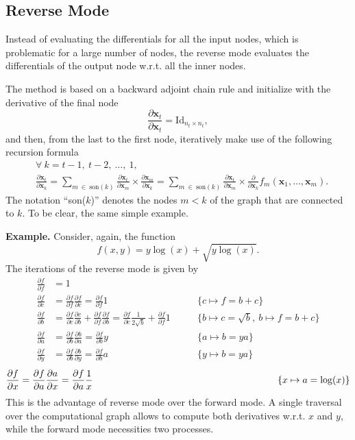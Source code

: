 \subsection{Reverse Mode}

Instead of evaluating the differentials for all the input nodes, which
is problematic for a large number of nodes, the reverse mode evaluates
the differentials of the output node w.r.t. all the inner nodes.

The method is based on a backward adjoint chain rule and initialize with
the derivative of the final node
\[
  \frac{\partial\bm{x}_{t}}{\partial\bm{x}_{t}} =
  \text{Id}_{n_{t} \times n_{t}},
\]
and then, from the last to the first node, iteratively make use of the
following recursion formula
\begin{align*}
  &\forall~k = t - 1,~t - 2,~\dots,~1,\\
  &\frac{\partial\bm{x}_{t}}{\partial\bm{x}_{k}} =
    \sum_{m~\in~\text{son}(k)}
    \frac{\partial\bm{x}_{t}}{\partial\bm{x}_{m}}\times
    \frac{\partial\bm{x}_{m}}{\partial\bm{x}_{k}} =
    \sum_{m~\in~\text{son}(k)}
    \frac{\partial\bm{x}_{t}}{\partial\bm{x}_{m}}\times
    \frac{\partial}{\partial\bm{x}_{k}}
    f_{m}(\bm{x}_{1}, \dots, \bm{x}_{m}).
\end{align*}
The notation ``son(\(k\))'' denotes the nodes \(m < k\) of the graph
that are connected to \(k\). To be clear, the same simple example.

\noindent\textbf{Example.}\hspace{.5cm}
Consider, again, the function
\[
  f(x, y) = y\log(x) + \sqrt{y\log(x)}.
\]
The iterations of the reverse mode is given by
\begin{align*}
  \frac{\partial f}{\partial f} &= 1\\
  \frac{\partial f}{\partial c} &=
  \frac{\partial f}{\partial f} \frac{\partial f}{\partial c} =
  \frac{\partial f}{\partial f} 1\qquad &\{c \mapsto f = b + c\}\\
  \frac{\partial f}{\partial b} &=
  \frac{\partial f}{\partial c} \frac{\partial c}{\partial b} +
  \frac{\partial f}{\partial f} \frac{\partial f}{\partial b} =
  \frac{\partial f}{\partial c} \frac{1}{2\sqrt{b}} +
  \frac{\partial f}{\partial f} 1\qquad
  &\{b \mapsto c = \sqrt{b},~b \mapsto f = b + c\}\\
  \frac{\partial f}{\partial a} &=
  \frac{\partial f}{\partial b} \frac{\partial b}{\partial a} =
  \frac{\partial f}{\partial b} y\qquad &\{a \mapsto b = ya\}\\
  \frac{\partial f}{\partial y} &=
  \frac{\partial f}{\partial b} \frac{\partial b}{\partial y} =
  \frac{\partial f}{\partial b} a \qquad &\{y \mapsto b = ya\}
\end{align*}
\begin{align*}
  \frac{\partial f}{\partial x} &=
  \frac{\partial f}{\partial a} \frac{\partial a}{\partial x} =
  \frac{\partial f}{\partial a} \frac{1}{x} \hspace{6.5cm}
  &\{x \mapsto a = \log(x)\}
\end{align*}
This is the advantage of reverse mode over the forward mode. A single
traversal over the computational graph allows to compute both
derivatives w.r.t. \(x\) and \(y\), while the forward mode necessities
two processes.

